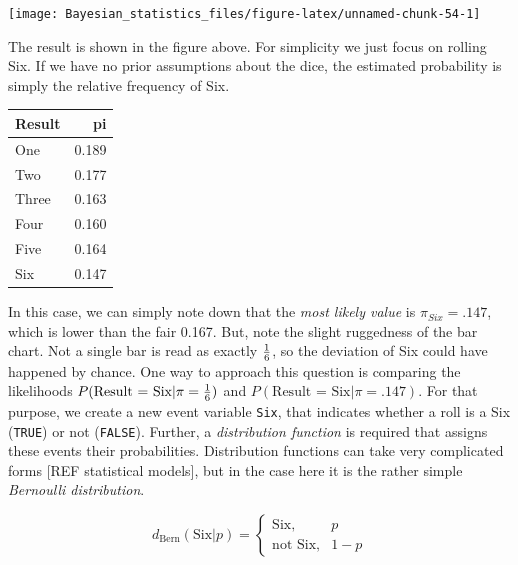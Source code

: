 \documentclass[]{svmono}
\newenvironment{Shaded}{\begin{snugshade}}{\end{snugshade}}
\newcommand{\KeywordTok}[1]{\textcolor[rgb]{0.13,0.29,0.53}{\textbf{#1}}}
\newcommand{\DataTypeTok}[1]{\textcolor[rgb]{0.13,0.29,0.53}{#1}}
\newcommand{\StringTok}[1]{\textcolor[rgb]{0.31,0.60,0.02}{#1}}
\newcommand{\OperatorTok}[1]{\textcolor[rgb]{0.81,0.36,0.00}{\textbf{#1}}}
\newcommand{\NormalTok}[1]{#1}
\begin{document}
\texttt{[image: Bayesian\_statistics\_files/figure-latex/unnamed-chunk-54-1]}

The result is shown in the figure above. For simplicity we just focus on
rolling Six. If we have no prior assumptions about the dice, the
estimated probability is simply the relative frequency of Six.

\begin{Shaded}
\end{Shaded}

\begin{tabular}{l|r}
\hline
Result & pi\\
\hline
One & 0.189\\
\hline
Two & 0.177\\
\hline
Three & 0.163\\
\hline
Four & 0.160\\
\hline
Five & 0.164\\
\hline
Six & 0.147\\
\hline
\end{tabular}

In this case, we can simply note down that the \emph{most likely value}
is \(\pi_{Six} =.147\), which is lower than the fair 0.167. But, note
the slight ruggedness of the bar chart. Not a single bar is read as
exactly \(1 \over 6\), so the deviation of Six could have happened by
chance. One way to approach this question is comparing the likelihoods
\(P(\text{Result = Six}|\pi = {1 \over 6})\) and
\(P(\text{Result = Six}|\pi = {.147})\). For that purpose, we create a
new event variable \texttt{Six}, that indicates whether a roll is a Six
(\texttt{TRUE}) or not (\texttt{FALSE}). Further, a \emph{distribution
function} is required that assigns these events their probabilities.
Distribution functions can take very complicated forms {[}REF
statistical models{]}, but in the case here it is the rather simple
\emph{Bernoulli distribution}.

\[
d_\text{Bern}(\text{Six}|p) = 
  \begin{cases}
    \text{Six} ,& p\\
    \text{not Six},& 1 - p
  \end{cases}
\]
\end{document}
